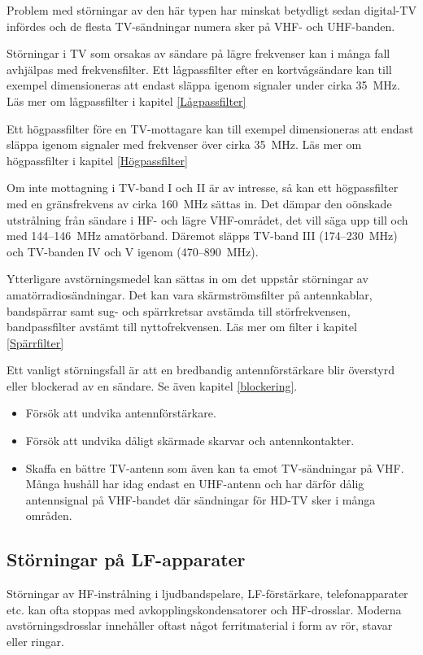 Problem med störningar av den här typen har minskat betydligt sedan digital-TV
infördes och de flesta TV-sändningar numera sker på VHF- och UHF-banden.

Störningar i TV som orsakas av sändare på lägre frekvenser kan i många fall
avhjälpas med frekvensfilter.
Ett lågpassfilter efter en kortvågsändare kan till exempel dimensioneras att
endast släppa igenom signaler under cirka 35~MHz. Läs mer om lågpassfilter i
kapitel \ref{Lågpassfilter}

Ett högpassfilter före en TV-mottagare kan till exempel dimensioneras att
endast släppa igenom signaler med frekvenser över cirka 35~MHz. Läs mer om
högpassfilter i kapitel \ref{Högpassfilter}

Om inte mottagning i TV-band I och II är av intresse, så kan ett
högpassfilter med en gränsfrekvens av cirka 160~MHz sättas in.
Det dämpar den oönskade utstrålning från sändare i HF- och lägre VHF-området,
det vill säga upp till och med 144--146~MHz amatörband.
Däremot släpps TV-band III (174--230~MHz) och TV-banden IV och V igenom
(470--890~MHz).

Ytterligare avstörningsmedel kan sättas in om det uppstår störningar av
amatörradiosändningar.
Det kan vara skärmströmsfilter på antennkablar, bandspärrar samt sug- och
spärrkretsar avstämda till störfrekvensen, bandpassfilter avstämt till
nyttofrekvensen. Läs mer om filter i kapitel \ref{Spärrfilter}

Ett vanligt störningsfall är att en bredbandig antennförstärkare blir 
överstyrd eller blockerad av en sändare. Se även kapitel \ref{blockering}.

\begin{itemize}
	\item Försök att undvika antennförstärkare.
	\item Försök att undvika dåligt skärmade skarvar och antennkontakter.
	\item Skaffa en bättre TV-antenn som även kan ta emot TV-sändningar på VHF.
	Många hushåll har idag endast en UHF-antenn och har därför dålig
	antennsignal på VHF-bandet där sändningar för HD-TV sker i många områden.
\end{itemize}

\subsection{Störningar på LF-apparater}

Störningar av HF-instrålning i ljudbandspelare, LF-förstärkare, telefonapparater
etc. kan ofta stoppas med avkopplingskondensatorer och HF-drosslar.
Moderna avstörningsdrosslar innehåller oftast något ferritmaterial i form av
rör, stavar eller ringar.
